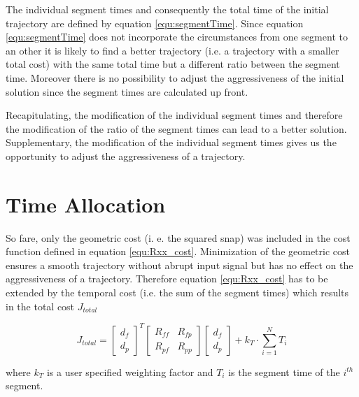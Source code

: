 The individual segment times and consequently the total time of the initial trajectory are defined by equation \ref{equ:segmentTime}. Since equation \ref{equ:segmentTime} does not incorporate the circumstances from one segment to an other it is likely to find a better trajectory (i.e. a trajectory with a smaller total cost) with the same total time but a different ratio between the segment time. Moreover there is no possibility to adjust the aggressiveness of the initial solution since the segment times are calculated up front. \newline

Recapitulating, the modification of the individual segment times and therefore the modification of the ratio of the segment times can lead to a better solution. Supplementary, the modification of the individual segment times gives us the opportunity to adjust the aggressiveness of a trajectory.



\section{Time Allocation}\label{sec:penalty}

So fare, only the geometric cost (i. e. the squared snap) was included in the cost function defined in equation \ref{equ:Rxx_cost}. Minimization of the geometric cost ensures a smooth trajectory without abrupt input signal but has no effect on the aggressiveness of a trajectory. Therefore equation \ref{equ:Rxx_cost} has to be extended by the temporal cost (i.e. the sum of the segment times) which results in the total cost $J_{total}$

\begin{equation}
J_{total} =
\begin{bmatrix}
   d_f \\
  d_p
\end{bmatrix}^T
\begin{bmatrix}
   R_{ff} & R_{fp} \\
  R_{pf} & R_{pp}
\end{bmatrix}
\begin{bmatrix}
   d_f \\
  d_p
\end{bmatrix}
+ k_T \cdot \sum_{i=1}^N T_i
\label{equ:total_cost}
\end{equation}

where $k_T$ is a user specified weighting factor and $T_i$ is the segment time of the $i^{th}$ segment. \newline

